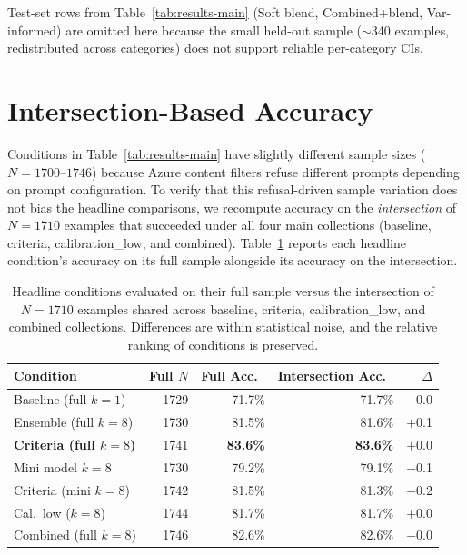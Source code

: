 \documentclass{article}
\begin{document}
Test-set rows from Table~\ref{tab:results-main} (Soft blend, Combined+blend, Var-informed) are omitted here because the small held-out sample (${\sim}$340 examples, redistributed across categories) does not support reliable per-category CIs.

\section{Intersection-Based Accuracy}
\label{sec:intersection}

Conditions in Table~\ref{tab:results-main} have slightly different sample sizes ($N{=}1700$--$1746$) because Azure content filters refuse different prompts depending on prompt configuration. To verify that this refusal-driven sample variation does not bias the headline comparisons, we recompute accuracy on the \emph{intersection} of $N{=}1710$ examples that succeeded under all four main collections (baseline, criteria, calibration\_low, and combined). Table~\ref{tab:intersection} reports each headline condition's accuracy on its full sample alongside its accuracy on the intersection.

\begin{table}[ht]
\centering
\caption{Headline conditions evaluated on their full sample versus the intersection of $N{=}1710$ examples shared across baseline, criteria, calibration\_low, and combined collections. Differences are within statistical noise, and the relative ranking of conditions is preserved.}
\label{tab:intersection}
\small
\begin{tabular}{lrrrr}
\toprule
Condition & Full $N$ & Full Acc.\ & Intersection Acc.\ & $\Delta$ \\
\midrule
Baseline (full $k{=}1$)         & 1729 & 71.7\% & 71.7\% & $-$0.0 \\
Ensemble (full $k{=}8$)         & 1730 & 81.5\% & 81.6\% & $+$0.1 \\
\textbf{Criteria (full $k{=}8$)} & 1741 & \textbf{83.6\%} & \textbf{83.6\%} & $+$0.0 \\
Mini model $k{=}8$              & 1730 & 79.2\% & 79.1\% & $-$0.1 \\
Criteria (mini $k{=}8$)         & 1742 & 81.5\% & 81.3\% & $-$0.2 \\
Cal.\ low ($k{=}8$)             & 1744 & 81.7\% & 81.7\% & $+$0.0 \\
Combined (full $k{=}8$)         & 1746 & 82.6\% & 82.6\% & $-$0.0 \\
\bottomrule
\end{tabular}
\end{table}
\end{document}
